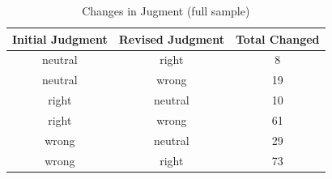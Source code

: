 \documentclass[
  man,floatsintext]{apa6}
\begin{document}
\begin{table}[tbp]

\begin{center}
\begin{threeparttable}

\caption{\label{tab:tabS6change}Changes in Jugment (full sample)}

\begin{tabular}{ccc}
\toprule
Initial Judgment & \multicolumn{1}{c}{Revised Judgment} & \multicolumn{1}{c}{Total Changed}\\
\midrule
neutral & right & 8\\
neutral & wrong & 19\\
right & neutral & 10\\
right & wrong & 61\\
wrong & neutral & 29\\
wrong & right & 73\\
\bottomrule
\end{tabular}

\end{threeparttable}
\end{center}

\end{table}
\end{document}
